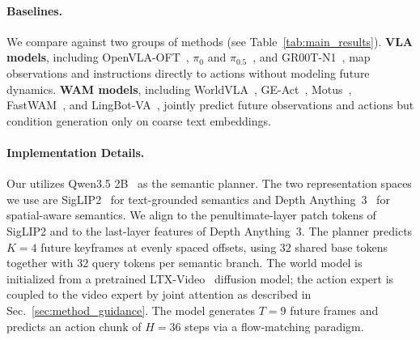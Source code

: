 \paragraph{Baselines.}
We compare against two groups of methods (see Table~\ref{tab:main_results}).
\textbf{VLA models}, including OpenVLA-OFT~\cite{KimM1-RSS-25}, $\pi_0$ and $\pi_{0.5}$~\cite{BlackK-RSS-25,black2025pi}, and GR00T-N1~\cite{bjorck2025gr00t}, map observations and instructions directly to actions without modeling future dynamics.
\textbf{WAM models}, including WorldVLA~\cite{worldvla}, GE-Act~\cite{genieenvisioner}, Motus~\cite{bi2025motus}, FastWAM~\cite{fastwam}, and LingBot-VA~\cite{lingbotva}, jointly predict future observations and actions but condition generation only on coarse text embeddings.


\paragraph{Implementation Details.}
Our \ourmethod utilizes Qwen3.5 2B~\cite{qwen35} as the semantic planner.
The two representation spaces we use are SigLIP2~\cite{siglip2} for text-grounded semantics and Depth Anything~3~\cite{lin2025depth} for spatial-aware semantics.
We align to the penultimate-layer patch tokens of SigLIP2 and to the last-layer features of Depth Anything~3. 
The planner predicts $K{=}4$ future keyframes at evenly spaced offsets, using $32$ shared base tokens together with $32$ query tokens per semantic branch.
The world model is initialized from a pretrained LTX-Video~\cite{ltxvideo} diffusion model; the action expert is coupled to the video expert by joint attention as described in Sec.~\ref{sec:method_guidance}.
The model generates $T{=}9$ future frames and predicts an action chunk of $H{=}36$ steps via a flow-matching paradigm.
